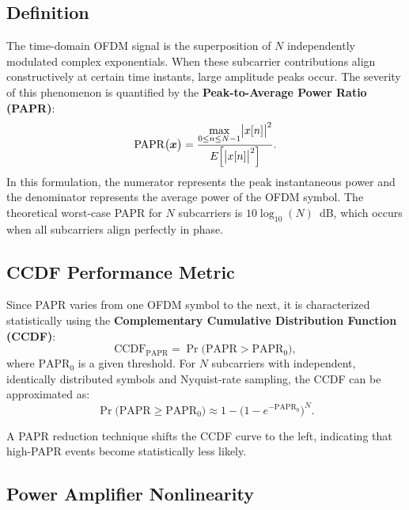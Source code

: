 \subsection{Definition}

The time-domain OFDM signal is the superposition of $N$ independently modulated complex exponentials. When these subcarrier contributions align constructively at certain time instants, large amplitude peaks occur. The severity of this phenomenon is quantified by the \textbf{Peak-to-Average Power Ratio (PAPR)}:
\begin{equation*}
    \mathrm{PAPR}\bigl(\bm{x}\bigr)
    = \frac{\displaystyle\max_{0 \le n \le N-1}\bigl|x[n]\bigr|^{2}}
    {E\Bigl[\bigl|x[n]\bigr|^{2}\Bigr]}.
\end{equation*}
In this formulation, the numerator represents the peak instantaneous power and the denominator represents the average power of the OFDM symbol. The theoretical worst-case PAPR for $N$ subcarriers is $10\log_{10}(N)$~dB, which occurs when all subcarriers align perfectly in phase.

\subsection{CCDF Performance Metric}

Since PAPR varies from one OFDM symbol to the next, it is characterized statistically using the \textbf{Complementary Cumulative Distribution Function (CCDF)}:
\begin{equation*}
    \mathrm{CCDF}_{\mathrm{PAPR}}
    = \Pr\bigl(\mathrm{PAPR} > \mathrm{PAPR}_0\bigr),
\end{equation*}
where $\mathrm{PAPR}_0$ is a given threshold. For $N$ subcarriers with independent, identically distributed symbols and Nyquist-rate sampling, the CCDF can be approximated as:
\begin{equation*}
    \Pr\bigl(\mathrm{PAPR} \ge \mathrm{PAPR}_0\bigr)
    \approx 1 - \bigl(1 - e^{-\mathrm{PAPR}_0}\bigr)^{N}.
\end{equation*}

A PAPR reduction technique shifts the CCDF curve to the left, indicating that high-PAPR events become statistically less likely.

\subsection{Power Amplifier Nonlinearity}

